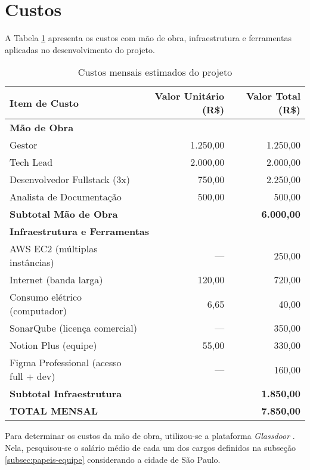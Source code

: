 \section{Custos}

\label{sec:custos}

A Tabela \ref{tab:custo-mensal-projeto} apresenta os custos com mão de obra, infraestrutura e ferramentas aplicadas no desenvolvimento do projeto.

\begin{table}[htbp]
	\centering
	\caption{Custos mensais estimados do projeto}
	\label{tab:custo-mensal-projeto}
	\begin{tabular}{lrr}
		\toprule
		\textbf{Item de Custo} & \textbf{Valor Unitário (R\$)} & \textbf{Valor Total (R\$)} \\
		\midrule
		\multicolumn{3}{l}{\textbf{Mão de Obra}} \\
		\quad Gestor & 1.250,00 & 1.250,00 \\
		\quad Tech Lead & 2.000,00 & 2.000,00 \\
		\quad Desenvolvedor Fullstack (3x) & 750,00 & 2.250,00 \\
		\quad Analista de Documentação & 500,00 & 500,00 \\
		\cmidrule{3-3}
		\multicolumn{2}{l}{\textbf{Subtotal Mão de Obra}} & \textbf{6.000,00} \\
		\midrule
		\multicolumn{3}{l}{\textbf{Infraestrutura e Ferramentas}} \\
		\quad AWS EC2 (múltiplas instâncias) & --- & 250,00 \\
		\quad Internet (banda larga) & 120,00 & 720,00 \\
		\quad Consumo elétrico (computador) & 6,65 & 40,00 \\
		\quad SonarQube (licença comercial) & --- & 350,00 \\
		\quad Notion Plus (equipe) & 55,00 & 330,00 \\
		\quad Figma Professional (acesso full + dev) & --- & 160,00 \\
		\cmidrule{3-3}
		\multicolumn{2}{l}{\textbf{Subtotal Infraestrutura}} & \textbf{1.850,00} \\
		\midrule
		\multicolumn{2}{l}{\textbf{TOTAL MENSAL}} & \textbf{7.850,00} \\
		\bottomrule
	\end{tabular}
\end{table}

Para determinar os custos da mão de obra, utilizou-se a plataforma \emph{Glassdoor} \cite{glassdoor-2025}. Nela, pesquisou-se o salário médio de cada um dos cargos definidos na subseção \ref{subsec:papeis-equipe} considerando a cidade de São Paulo.

